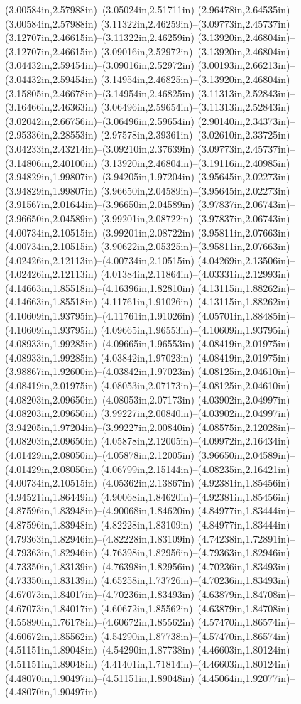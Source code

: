 (3.00584in,2.57988in)--(3.05024in,2.51711in) (2.96478in,2.64535in)--(3.00584in,2.57988in) (3.11322in,2.46259in)--(3.09773in,2.45737in) (3.12707in,2.46615in)--(3.11322in,2.46259in) (3.13920in,2.46804in)--(3.12707in,2.46615in) (3.09016in,2.52972in)--(3.13920in,2.46804in) (3.04432in,2.59454in)--(3.09016in,2.52972in) (3.00193in,2.66213in)--(3.04432in,2.59454in) (3.14954in,2.46825in)--(3.13920in,2.46804in) (3.15805in,2.46678in)--(3.14954in,2.46825in) (3.11313in,2.52843in)--(3.16466in,2.46363in) (3.06496in,2.59654in)--(3.11313in,2.52843in) (3.02042in,2.66756in)--(3.06496in,2.59654in) (2.90140in,2.34373in)--(2.95336in,2.28553in) (2.97578in,2.39361in)--(3.02610in,2.33725in) (3.04233in,2.43214in)--(3.09210in,2.37639in) (3.09773in,2.45737in)--(3.14806in,2.40100in) (3.13920in,2.46804in)--(3.19116in,2.40985in) (3.94829in,1.99807in)--(3.94205in,1.97204in) (3.95645in,2.02273in)--(3.94829in,1.99807in) (3.96650in,2.04589in)--(3.95645in,2.02273in) (3.91567in,2.01644in)--(3.96650in,2.04589in) (3.97837in,2.06743in)--(3.96650in,2.04589in) (3.99201in,2.08722in)--(3.97837in,2.06743in) (4.00734in,2.10515in)--(3.99201in,2.08722in) (3.95811in,2.07663in)--(4.00734in,2.10515in) (3.90622in,2.05325in)--(3.95811in,2.07663in) (4.02426in,2.12113in)--(4.00734in,2.10515in) (4.04269in,2.13506in)--(4.02426in,2.12113in) (4.01384in,2.11864in)--(4.03331in,2.12993in) (4.14663in,1.85518in)--(4.16396in,1.82810in) (4.13115in,1.88262in)--(4.14663in,1.85518in) (4.11761in,1.91026in)--(4.13115in,1.88262in) (4.10609in,1.93795in)--(4.11761in,1.91026in) (4.05701in,1.88485in)--(4.10609in,1.93795in) (4.09665in,1.96553in)--(4.10609in,1.93795in) (4.08933in,1.99285in)--(4.09665in,1.96553in) (4.08419in,2.01975in)--(4.08933in,1.99285in) (4.03842in,1.97023in)--(4.08419in,2.01975in) (3.98867in,1.92600in)--(4.03842in,1.97023in) (4.08125in,2.04610in)--(4.08419in,2.01975in) (4.08053in,2.07173in)--(4.08125in,2.04610in) (4.08203in,2.09650in)--(4.08053in,2.07173in) (4.03902in,2.04997in)--(4.08203in,2.09650in) (3.99227in,2.00840in)--(4.03902in,2.04997in) (3.94205in,1.97204in)--(3.99227in,2.00840in) (4.08575in,2.12028in)--(4.08203in,2.09650in) (4.05878in,2.12005in)--(4.09972in,2.16434in) (4.01429in,2.08050in)--(4.05878in,2.12005in) (3.96650in,2.04589in)--(4.01429in,2.08050in) (4.06799in,2.15144in)--(4.08235in,2.16421in) (4.00734in,2.10515in)--(4.05362in,2.13867in) (4.92381in,1.85456in)--(4.94521in,1.86449in) (4.90068in,1.84620in)--(4.92381in,1.85456in) (4.87596in,1.83948in)--(4.90068in,1.84620in) (4.84977in,1.83444in)--(4.87596in,1.83948in) (4.82228in,1.83109in)--(4.84977in,1.83444in) (4.79363in,1.82946in)--(4.82228in,1.83109in) (4.74238in,1.72891in)--(4.79363in,1.82946in) (4.76398in,1.82956in)--(4.79363in,1.82946in) (4.73350in,1.83139in)--(4.76398in,1.82956in) (4.70236in,1.83493in)--(4.73350in,1.83139in) (4.65258in,1.73726in)--(4.70236in,1.83493in) (4.67073in,1.84017in)--(4.70236in,1.83493in) (4.63879in,1.84708in)--(4.67073in,1.84017in) (4.60672in,1.85562in)--(4.63879in,1.84708in) (4.55890in,1.76178in)--(4.60672in,1.85562in) (4.57470in,1.86574in)--(4.60672in,1.85562in) (4.54290in,1.87738in)--(4.57470in,1.86574in) (4.51151in,1.89048in)--(4.54290in,1.87738in) (4.46603in,1.80124in)--(4.51151in,1.89048in) (4.41401in,1.71814in)--(4.46603in,1.80124in) (4.48070in,1.90497in)--(4.51151in,1.89048in) (4.45064in,1.92077in)--(4.48070in,1.90497in) 